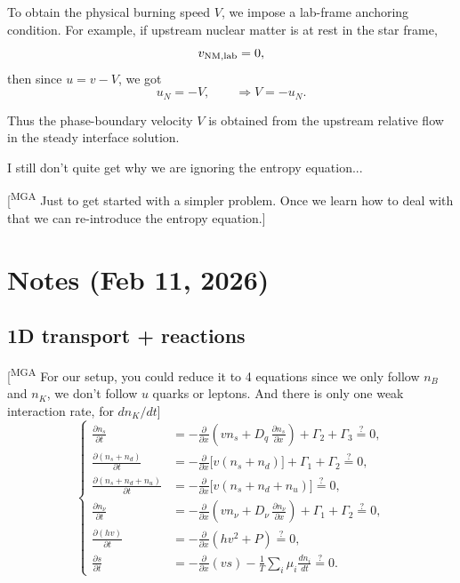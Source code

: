 \documentclass[11pt]{article}
\newcommand{\mgacom}[1]{\textsf{\color[rgb]{0.6,0,0}[\textsuperscript{MGA} #1]}}
\begin{document}
To obtain the physical burning speed $V$, we impose a lab-frame anchoring condition.
For example, if upstream nuclear matter is at rest in the star frame,
\begin{equation}
v_{\rm NM,lab} = 0,
\end{equation}
then since $u = v-V$, we got
\begin{equation}
u_N = -V,
\qquad
\Rightarrow
\boxed{V = -u_N.}
\end{equation}

Thus the phase-boundary velocity $V$ is obtained from the upstream 
relative flow in the steady interface solution.

I still don't quite get why we are ignoring the entropy equation...

\mgacom{Just to get started with a simpler problem. Once we learn how to deal with that we can re-introduce the entropy equation.}

\newpage
\section*{Notes (Feb 11, 2026)}

\subsection*{1D transport + reactions}

\mgacom{For our setup, you could reduce it to 4 equations since we only follow $n_B$ and $n_K$, we don't follow $u$ quarks or leptons. And there is only one weak interaction rate, for $d n_K/dt$}
\begin{equation}
\left\{
\begin{aligned}
\frac{\partial n_s}{\partial t}
&= -\frac{\partial}{\partial x}\!\left(v n_s + D_q\,\frac{\partial n_s}{\partial x}\right)
+ \Gamma_2 + \Gamma_3 \overset{?}{=} 0,
\\[4pt]
\frac{\partial (n_s+n_d)}{\partial t}
&= -\frac{\partial}{\partial x}\!\Big[v (n_s+n_d)\Big]
+ \Gamma_1 + \Gamma_2
\overset{?}{=} 0,
\\[4pt]
\frac{\partial (n_s+n_d+n_u)}{\partial t}
&= -\frac{\partial}{\partial x}\!\Big[v (n_s+n_d+n_u)\Big]
\overset{?}{=} 0,
\\[4pt]
\frac{\partial n_\nu}{\partial t}
&= -\frac{\partial}{\partial x}\!\left(v n_\nu + D_\nu\,\frac{\partial n_\nu}{\partial x}\right)
+ \Gamma_1 + \Gamma_2
\overset{?}{=} 0,
\\[4pt]
\frac{\partial (h v)}{\partial t}
&= -\frac{\partial}{\partial x}\!\left(h v^2 + P\right)
\overset{?}{=} 0,
\\[4pt]
\frac{\partial s}{\partial t}
&= -\frac{\partial}{\partial x}(v s)
-\frac{1}{T}\sum_i \mu_i \frac{d n_i}{d t}
\overset{?}{=} 0.
\end{aligned}
\right.
\end{equation}
\end{document}
